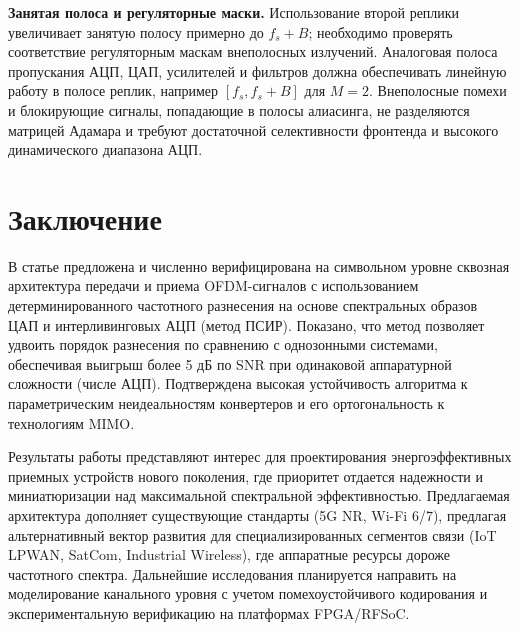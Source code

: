 \documentclass[a4paper,12pt]{article}
\numberwithin{equation}{section}
\begin{document}
\textbf{Занятая полоса и регуляторные маски.} Использование второй реплики увеличивает занятую полосу примерно до $f_s+B$; необходимо проверять соответствие регуляторным маскам внеполосных излучений. Аналоговая полоса пропускания АЦП, ЦАП, усилителей и фильтров должна обеспечивать линейную работу в полосе реплик, например $[f_s, f_s+B]$ для $M=2$. Внеполосные помехи и блокирующие сигналы, попадающие в полосы алиасинга, не разделяются матрицей Адамара и требуют достаточной селективности фронтенда и высокого динамического диапазона АЦП.

\section{Заключение}

В статье предложена и численно верифицирована на символьном уровне сквозная архитектура передачи и приема OFDM-сигналов с использованием детерминированного частотного разнесения на основе спектральных образов ЦАП и интерливинговых АЦП (метод ПСИР). Показано, что метод позволяет удвоить порядок разнесения по сравнению с однозонными системами, обеспечивая выигрыш более 5 дБ по SNR при одинаковой аппаратурной сложности (числе АЦП). Подтверждена высокая устойчивость алгоритма к параметрическим неидеальностям конвертеров и его ортогональность к технологиям MIMO.

Результаты работы представляют интерес для проектирования энергоэффективных приемных устройств нового поколения, где приоритет отдается надежности и миниатюризации над максимальной спектральной эффективностью. Предлагаемая архитектура дополняет существующие стандарты (5G NR, Wi-Fi 6/7), предлагая альтернативный вектор развития для специализированных сегментов связи (IoT LPWAN, SatCom, Industrial Wireless), где аппаратные ресурсы дороже частотного спектра. Дальнейшие исследования планируется направить на моделирование канального уровня с учетом помехоустойчивого кодирования и экспериментальную верификацию на платформах FPGA/RFSoC.
\end{document}
